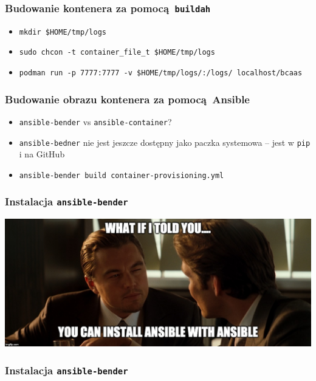 \documentclass[dvipsnames,table]{beamer}
\begin{document}
\begin{frame}[fragile]
	\frametitle{Budowanie kontenera za pomocą {\tt buildah}}

\begin{itemize}
	\item {\tt mkdir \$HOME/tmp/logs}
	\item {\tt sudo chcon -t container\_file\_t \$HOME/tmp/logs}
	\item {\tt podman run -p 7777:7777 -v \$HOME/tmp/logs/:/logs/ localhost/bcaas}
\end{itemize}
\end{frame}

\begin{frame}[fragile]
	\frametitle{Budowanie obrazu kontenera za pomocą Ansible}
%	
\begin{itemize}
	\item {\tt ansible-bender} vs {\tt ansible-container}?
	\item {\tt ansible-bedner} nie jest jeszcze dostępny jako paczka systemowa -- jest w {\tt pip} i na GitHub
	\item {\tt ansible-bender build container-provisioning.yml}
\end{itemize}
\end{frame}

\begin{frame}[fragile]
	\frametitle{Instalacja {\tt ansible-bender}}
\begin{center}
\includegraphics[scale=0.13]{img-ansibleinception.jpg}
\end{center}

\end{frame}

\begin{frame}[fragile]
	\frametitle{Instalacja {\tt ansible-bender}}

\end{frame}
\end{document}

